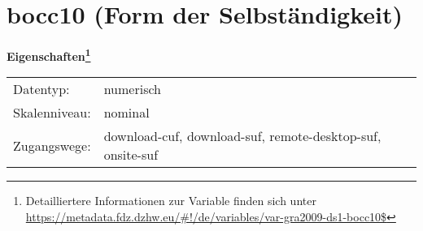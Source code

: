 
    \setcounter{footnote}{0}

    \vspace*{-1.8cm}
	\section{bocc10 (Form der Selbständigkeit)}
	\label{section:bocc10}



    \vspace*{0.5cm}
    \noindent\textbf{Eigenschaften\footnote{Detailliertere Informationen zur Variable finden sich unter
		\url{https://metadata.fdz.dzhw.eu/\#!/de/variables/var-gra2009-ds1-bocc10$}}}\\
	\begin{tabularx}{\hsize}{@{}lX}
	Datentyp: & numerisch \\
	Skalenniveau: & nominal \\
	Zugangswege: &
	  download-cuf, 
	  download-suf, 
	  remote-desktop-suf, 
	  onsite-suf
 \\
    \end{tabularx}



